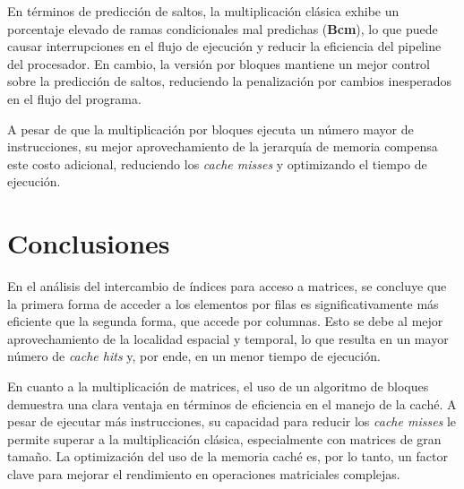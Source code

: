 \documentclass[conference]{IEEEtran}
\begin{document}
En términos de predicción de saltos, la multiplicación clásica exhibe un porcentaje elevado de ramas condicionales mal predichas (\textbf{Bcm}), lo que puede causar interrupciones en el flujo de ejecución y reducir la eficiencia del pipeline del procesador. En cambio, la versión por bloques mantiene un mejor control sobre la predicción de saltos, reduciendo la penalización por cambios inesperados en el flujo del programa.

A pesar de que la multiplicación por bloques ejecuta un número mayor de instrucciones, su mejor aprovechamiento de la jerarquía de memoria compensa este costo adicional, reduciendo los \textit{cache misses} y optimizando el tiempo de ejecución.

    
\section{Conclusiones}

En el análisis del intercambio de índices para acceso a matrices, se concluye que la primera forma de acceder a los elementos por filas es significativamente más eficiente que la segunda forma, que accede por columnas. Esto se debe al mejor aprovechamiento de la localidad espacial y temporal, lo que resulta en un mayor número de \textit{cache hits} y, por ende, en un menor tiempo de ejecución.

En cuanto a la multiplicación de matrices, el uso de un algoritmo de bloques demuestra una clara ventaja en términos de eficiencia en el manejo de la caché. A pesar de ejecutar más instrucciones, su capacidad para reducir los \textit{cache misses} le permite superar a la multiplicación clásica, especialmente con matrices de gran tamaño. La optimización del uso de la memoria caché es, por lo tanto, un factor clave para mejorar el rendimiento en operaciones matriciales complejas.



\end{document}
